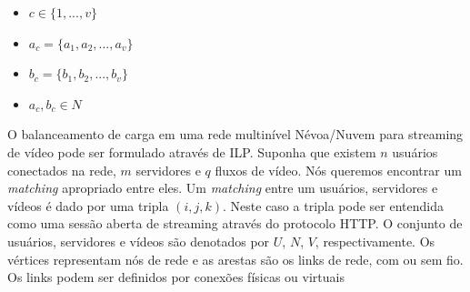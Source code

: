\vspace{0.5cm}
\begin{itemize}

\item  $c \in \{1,...,v\}$

\item  $a_{c} = \{a_{1},a_{2},...,a_{v}\}$

\item  $b_{c} = \{b_{1},b_{2},...,b_{v}\}$

\item  $a_{c},b_{c} \in N$

\end{itemize}
\vspace{0.5cm}


O balanceamento de carga em uma rede multinível Névoa/Nuvem para streaming de vídeo pode ser formulado através de ILP.
Suponha que existem $n$ usuários conectados na rede, $m$ servidores e $q$ fluxos de vídeo. Nós queremos encontrar um \textit{matching} apropriado entre eles. Um \textit{matching} entre um usuários, servidores e vídeos é dado por uma tripla $(i,j,k)$. Neste caso a tripla pode ser entendida como uma sessão aberta de streaming através do protocolo HTTP. O conjunto de usuários, servidores e vídeos são denotados por $U$, $N$, $V$, respectivamente.
Os vértices representam nós de rede e as arestas são os links de rede, com ou sem fio. Os links podem ser definidos por conexões físicas ou virtuais







